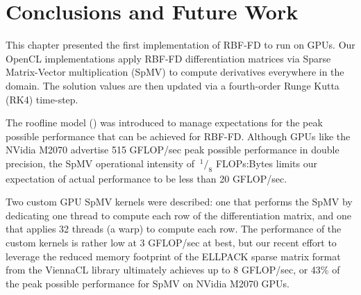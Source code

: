 \documentclass{report}
\begin{document}
\section{Conclusions and Future Work}

This chapter presented the first implementation of RBF-FD to run on GPUs. Our OpenCL implementations apply RBF-FD differentiation matrices via Sparse Matrix-Vector multiplication (SpMV) to compute derivatives everywhere in the domain. The solution values are then updated via a fourth-order Runge Kutta (RK4) time-step. 


The roofline model (\cite{Williams2009}) was introduced to manage expectations for the peak possible performance that can be achieved for RBF-FD. Although GPUs like the NVidia M2070 advertise 515 GFLOP/sec peak possible performance in double precision, the SpMV operational intensity of $\ ^{1}/_{8}$ FLOPs:Bytes limits our expectation of actual performance to be less than 20 GFLOP/sec. 

Two custom GPU SpMV kernels were described: one that performs the SpMV by dedicating one thread to compute each row of the differentiation matrix, and one that applies 32 threads (a warp) to compute each row. The performance of the custom kernels is rather low at 3 GFLOP/sec at best, but our recent effort to leverage the reduced memory footprint of the ELLPACK sparse matrix format from the ViennaCL library ultimately achieves up to 8 GFLOP/sec, or 43\% of the peak possible performance for SpMV on NVidia M2070 GPUs. 
\end{document}
